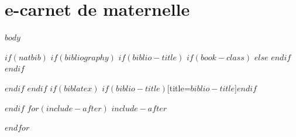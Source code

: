 \documentclass[french, oneside]{scrbook} %
\begin{document}
\chapter{e-carnet de maternelle}


$body$


$if(natbib)$
$if(bibliography)$
$if(biblio-title)$
$if(book-class)$
\renewcommand\bibname{$biblio-title$}
$else$
\renewcommand\refname{$biblio-title$}
$endif$
$endif$


$endif$
$endif$
$if(biblatex)$
\printbibliography$if(biblio-title)$[title=$biblio-title$]$endif$

$endif$
$for(include-after)$
$include-after$

$endfor$



\cleardoublepage
\setlength{\columnsep}{0.75cm}
\printindex{}
\end{document}
